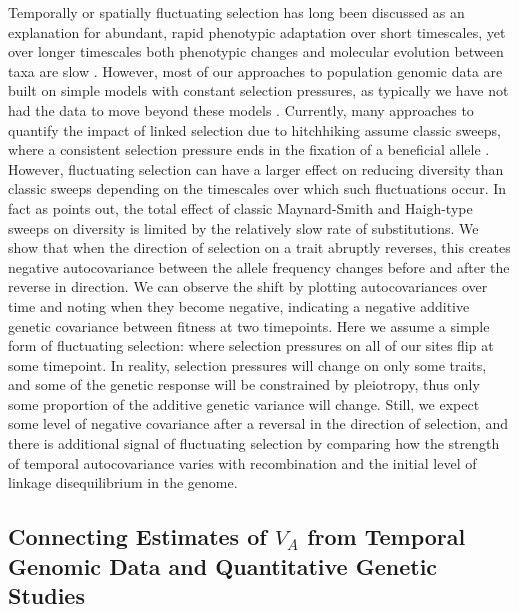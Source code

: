 \documentclass[11pt]{article}
\begin{document}
Temporally or spatially fluctuating selection has long been discussed as an
explanation for abundant, rapid phenotypic adaptation over short timescales,
yet over longer timescales both phenotypic changes and molecular evolution
between taxa are slow \parencite{Messer2016-mn,Hendry1999-zu,Gingerich1983-cc}.
However, most of our approaches to population genomic data are built on simple
models with constant selection pressures, as typically we have not had the data
to move beyond these models \parencite{Messer2016-mn}. Currently, many
approaches to quantify the impact of linked selection due to hitchhiking assume
classic sweeps, where a consistent selection pressure ends in the fixation of a
beneficial allele \parencite{Sella2009-rf,Hernandez2011-gs,Wiehe1993-ja}.
However, fluctuating selection can have a larger effect on reducing diversity
than classic sweeps \parencite{Barton2000-zg} depending on the timescales over
which such fluctuations occur. In fact as \textcite{Barton2000-zg} points out,
the total effect of classic Maynard-Smith and Haigh-type sweeps on diversity is
limited by the relatively slow rate of substitutions. We show that when the
direction of selection on a trait abruptly reverses, this creates negative
autocovariance between the allele frequency changes before and after the
reverse in direction. We can observe the shift by plotting autocovariances over
time and noting when they become negative, indicating a negative additive
genetic covariance between fitness at two timepoints. Here we assume a simple
form of fluctuating selection: where selection pressures on all of our sites
flip at some timepoint. In reality, selection pressures will change on only
some traits, and some of the genetic response will be constrained by
pleiotropy, thus only some proportion of the additive genetic variance will
change. Still, we expect some level of negative covariance after a reversal in
the direction of selection, and there is additional signal of fluctuating
selection by comparing how the strength of temporal autocovariance varies with
recombination and the initial level of linkage disequilibrium in the genome.

\subsection{Connecting Estimates of $V_A$ from Temporal Genomic Data and
Quantitative Genetic Studies}
\end{document}
